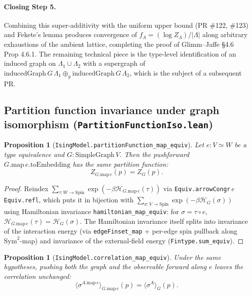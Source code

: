 \documentclass[a4paper,11pt]{article}
\newtheorem{proposition}[theorem]{Proposition}
\begin{document}
\paragraph{Closing Step 5.} Combining this super-additivity with the
uniform upper bound (PR \#122, \#123) and Fekete's lemma produces
convergence of
$f_\Lambda = (\log Z_\Lambda)/|\Lambda|$ along arbitrary
exhaustions of the ambient lattice, completing the proof of
Glimm--Jaffe \S 4.6 Prop 4.6.1. The remaining technical piece is
the type-level identification of an induced graph on
$\Lambda_1 \cup \Lambda_2$ with a supergraph of
$\mathrm{inducedGraph}\,G\,\Lambda_1 \oplus_g \mathrm{inducedGraph}\,G\,\Lambda_2$,
which is the subject of a subsequent PR.

\subsection{Partition function invariance under graph isomorphism
(\texttt{PartitionFunctionIso.lean})}

\begin{proposition}[\texttt{IsingModel.partitionFunction\_map\_equiv}]
Let $e \colon V \simeq W$ be a type equivalence and
$G \colon \mathrm{SimpleGraph}\,V$. Then the pushforward
$G.\mathrm{map}\,e.\mathrm{toEmbedding}$ has the same partition function:
\[
  Z_{G.\mathrm{map}\,e}(p) = Z_G(p).
\]
\end{proposition}

\begin{proof}
Reindex $\sum_{\tau : W \to \mathrm{Spin}} \exp(-\beta \mathcal{H}_{G.\mathrm{map}\,e}(\tau))$ via
\texttt{Equiv.arrowCongr}\,$e$\,\texttt{Equiv.refl}, which puts it in
bijection with $\sum_{\sigma : V \to \mathrm{Spin}} \exp(-\beta \mathcal{H}_G(\sigma))$
using Hamiltonian invariance
\texttt{hamiltonian\_map\_equiv}: for $\sigma = \tau \circ e$,
$\mathcal{H}_{G.\mathrm{map}\,e}(\tau) = \mathcal{H}_G(\sigma)$. The
Hamiltonian invariance itself splits into invariance of the
interaction energy (via \texttt{edgeFinset\_map} + per-edge
spin pullback along $\mathrm{Sym}^2$-map) and invariance of the
external-field energy (\texttt{Fintype.sum\_equiv}).
\end{proof}

\begin{proposition}[\texttt{IsingModel.correlation\_map\_equiv}]
Under the same hypotheses, pushing both the graph and the observable forward
along $e$ leaves the correlation unchanged:
\[
  \langle\sigma^{A.\mathrm{map}\,e}\rangle_{G.\mathrm{map}\,e}(p)
    = \langle\sigma^{A}\rangle_{G}(p).
\]
\end{proposition}
\end{document}

